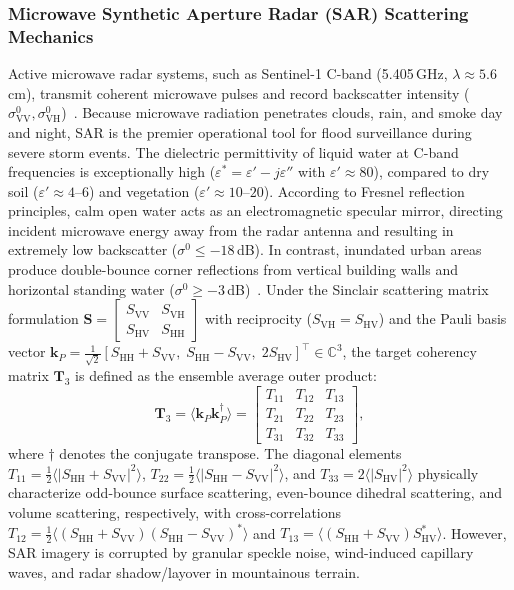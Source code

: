 \subsubsection{Microwave Synthetic Aperture Radar (SAR) Scattering Mechanics}
Active microwave radar systems, such as Sentinel-1 C-band (5.405\,GHz, $\lambda \approx 5.6$\,cm), transmit coherent microwave pulses and record backscatter intensity ($\sigma^0_{\text{VV}}, \sigma^0_{\text{VH}}$)~\cite{clement2018multi,boudjit2021sen12flood}. Because microwave radiation penetrates clouds, rain, and smoke day and night, SAR is the premier operational tool for flood surveillance during severe storm events. The dielectric permittivity of liquid water at C-band frequencies is exceptionally high ($\varepsilon^* = \varepsilon' - j\varepsilon''$ with $\varepsilon' \approx 80$), compared to dry soil ($\varepsilon' \approx 4\text{--}6$) and vegetation ($\varepsilon' \approx 10\text{--}20$). According to Fresnel reflection principles, calm open water acts as an electromagnetic specular mirror, directing incident microwave energy away from the radar antenna and resulting in extremely low backscatter ($\sigma^0 \le -18$\,dB). In contrast, inundated urban areas produce double-bounce corner reflections from vertical building walls and horizontal standing water ($\sigma^0 \ge -3$\,dB)~\cite{clement2018multi}. Under the Sinclair scattering matrix formulation $\mathbf{S} = \begin{bmatrix} S_{\text{VV}} & S_{\text{VH}} \\ S_{\text{HV}} & S_{\text{HH}} \end{bmatrix}$ with reciprocity ($S_{\text{VH}} = S_{\text{HV}}$) and the Pauli basis vector $\bm{k}_P = \frac{1}{\sqrt{2}} [ S_{\text{HH}} + S_{\text{VV}}, \; S_{\text{HH}} - S_{\text{VV}}, \; 2 S_{\text{HV}} ]^\top \in \mathbb{C}^3$, the target coherency matrix $\mathbf{T}_3$ is defined as the ensemble average outer product:
\begin{equation}
    \mathbf{T}_3 = \langle \bm{k}_P \bm{k}_P^\dagger \rangle = \begin{bmatrix}
    T_{11} & T_{12} & T_{13} \\
    T_{21} & T_{22} & T_{23} \\
    T_{31} & T_{32} & T_{33}
    \end{bmatrix},
    \label{eq:coherency_matrix}
\end{equation}
where $\dagger$ denotes the conjugate transpose. The diagonal elements $T_{11} = \frac{1}{2}\langle |S_{\text{HH}}+S_{\text{VV}}|^2 \rangle$, $T_{22} = \frac{1}{2}\langle |S_{\text{HH}}-S_{\text{VV}}|^2 \rangle$, and $T_{33} = 2\langle |S_{\text{HV}}|^2 \rangle$ physically characterize odd-bounce surface scattering, even-bounce dihedral scattering, and volume scattering, respectively, with cross-correlations $T_{12} = \frac{1}{2}\langle (S_{\text{HH}}+S_{\text{VV}})(S_{\text{HH}}-S_{\text{VV}})^* \rangle$ and $T_{13} = \langle (S_{\text{HH}}+S_{\text{VV}})S_{\text{HV}}^* \rangle$.
However, SAR imagery is corrupted by granular speckle noise, wind-induced capillary waves, and radar shadow/layover in mountainous terrain.

